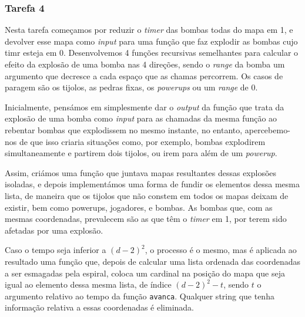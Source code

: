 \documentclass[a4paper]{article}
\begin{document}
\pagebreak

\subsubsection{Tarefa 4}

\hspace{0.54cm}Nesta tarefa começamos por reduzir o \textit{timer} das bombas todas do mapa em 1, e devolver esse mapa 
    como \textit{input} para uma função que faz explodir as bombas cujo timr esteja em 0.
    Desenvolvemos 4 funções recursivas semelhantes para calcular o efeito da explosão de uma bomba nas 4 direções,
    sendo o \textit{range} da bomba um argumento que decresce a cada espaço que as chamas percorrem. Os casos de 
    paragem são os tijolos, as pedras fixas, os \textit{powerups} ou um \textit{range} de 0. 
    
    Inicialmente, pensámos em simplesmente dar o \textit{output} da função que trata da explosão de uma bomba como
    \textit{input} para as chamadas da mesma função ao rebentar bombas que explodissem no mesmo instante, no entanto,
    apercebemo-nos de que isso criaria situações como, por exemplo, bombas explodirem simultaneamente e partirem 
    dois tijolos, ou irem para além de um \textit{powerup}.  
    
    Assim, criámos uma função que juntava mapas resultantes dessas explosões isoladas, e depois
    implementámos uma forma de fundir os elementos dessa mesma lista, de maneira que os tijolos que não constem
    em todos os mapas deixam de existir, bem como powerups, jogadores, e bombas. As bombas que, com as mesmas
    coordenadas, prevalecem são as que têm o \textit{timer} em 1, por terem sido afetadas por uma explosão.
    \hspace{6.5cm} \linebreak

    
    Caso o tempo seja inferior a $(d-2)^2$, o processo é o mesmo, mas é aplicada ao resultado uma função que,
    depois de calcular uma lista ordenada das coordenadas a ser esmagadas pela espiral, coloca um cardinal na 
    posição do mapa que seja igual ao elemento dessa mesma lista, de índice $(d-2)^2 -t$, sendo $t$ o argumento
    relativo ao tempo da função \texttt{avanca}. Qualquer string que tenha informação relativa a essas coordenadas
    é eliminada. \hspace{3cm}
    \linebreak
    
\end{document}
